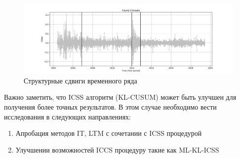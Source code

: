 \documentclass[a4paper,14pt,russian]{extarticle}
\begin{document}
	\begin{figure}[H]
		\includegraphics[width=\linewidth]{ru_stock_simulation_LKOH.png}
		\caption{\label{fig:fig3} Структурные сдвиги временного ряда}
	\end{figure}
	Важно заметить, что ICSS алгоритм (KL-CUSUM) может быть улучшен для получения более точных результатов. В этом случае необходимо вести исследования в следующих направлениях:
	\begin{enumerate}
		\item Апробация методов IT, LTM с сочетании с ICSS процедурой
		\item Улучшении возможностей ICCS процедуру такие как ML-KL-ICSS
	\end{enumerate}
\end{document}
